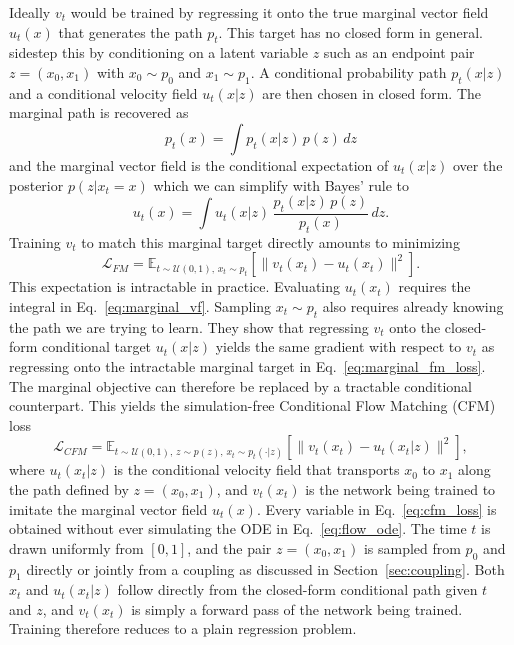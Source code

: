 \documentclass{article}
\begin{document}
Ideally $v_t$ would be trained by regressing it onto the true marginal vector field $u_t(x)$ that generates the path $p_t$.
This target has no closed form in general.
\citet{lipman2023flow} sidestep this by conditioning on a latent variable $z$ such as an endpoint pair $z=(x_0,x_1)$ with $x_0\sim p_0$ and $x_1\sim p_1$.
A conditional probability path $p_t(x|z)$ and a conditional velocity field $u_t(x|z)$ are then chosen in closed form.
The marginal path is recovered as
\begin{equation}
p_t(x) = \int p_t(x|z)\, p(z)\, dz
\end{equation}
and the marginal vector field is the conditional expectation of $u_t(x|z)$ over the posterior $p(z|x_t=x)$ which we can simplify with Bayes' rule to
\begin{equation}
    u_t(x) = \int u_t(x|z)\, \frac{p_t(x|z)\, p(z)}{p_t(x)} \, dz.
    \label{eq:marginal_vf}
\end{equation}
Training $v_t$ to match this marginal target directly amounts to minimizing
\begin{equation}
    \mathcal{L}_{FM} = \mathbb{E}_{t \sim \mathcal{U}(0,1),\, x_t \sim p_t} \left[ \| v_t(x_t) - u_t(x_t) \|^2 \right].
    \label{eq:marginal_fm_loss}
\end{equation}
This expectation is intractable in practice.
Evaluating $u_t(x_t)$ requires the integral in Eq.~\eqref{eq:marginal_vf}.
Sampling $x_t \sim p_t$ also requires already knowing the path we are trying to learn.
They show that regressing $v_t$ onto the closed-form conditional target $u_t(x|z)$ yields the same gradient with respect to $v_t$ as regressing onto the intractable marginal target in Eq.~\eqref{eq:marginal_fm_loss}.
The marginal objective can therefore be replaced by a tractable conditional counterpart.
This yields the simulation-free Conditional Flow Matching (CFM) loss
\begin{equation}
    \mathcal{L}_{CFM} = \mathbb{E}_{t \sim \mathcal{U}(0,1),\, z \sim p(z),\, x_t \sim p_t(\cdot|z)} \left[ \| v_t(x_t) - u_t(x_t|z) \|^2 \right],
    \label{eq:cfm_loss}
\end{equation}
where $u_t(x_t|z)$ is the conditional velocity field that transports $x_0$ to $x_1$ along the path defined by $z = (x_0, x_1)$, and $v_t(x_t)$ is the network being trained to imitate the marginal vector field $u_t(x)$.
Every variable in Eq.~\eqref{eq:cfm_loss} is obtained without ever simulating the ODE in Eq.~\eqref{eq:flow_ode}.
The time $t$ is drawn uniformly from $[0,1]$, and the pair $z=(x_0,x_1)$ is sampled from $p_0$ and $p_1$ directly or jointly from a coupling as discussed in Section~\ref{sec:coupling}.
Both $x_t$ and $u_t(x_t|z)$ follow directly from the closed-form conditional path given $t$ and $z$, and $v_t(x_t)$ is simply a forward pass of the network being trained.
Training therefore reduces to a plain regression problem.
\end{document}

